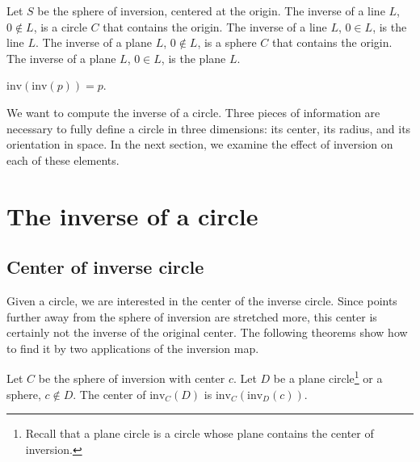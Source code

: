 \begin{corollary}
Let $S$ be the sphere of inversion, centered at the origin.
The inverse of a line $L$, $0 \not\in L$, is a circle $C$ that contains the 
origin.
The inverse of a line $L$, $0 \in L$, is the line $L$.
The inverse of a plane $L$, $0 \not\in L$, is a sphere $C$ that contains the
origin.
The inverse of a plane $L$, $0 \in L$, is the plane $L$.
\end{corollary}
$\mbox{inv}(\mbox{inv}(p)) = p$.
\QED

We want to compute the inverse of a circle.
Three pieces of information are necessary to fully define 
a circle in three dimensions: its center, its radius, and its
orientation in space.
In the next section, we examine the effect of inversion on each of these
elements.


\section{The inverse of a circle}
\label{sec-circleinverse}

\subsection{Center of inverse circle}

Given a circle, 
we are interested in the center of the inverse circle.
Since points further away from the sphere of inversion are
stretched more, this center is certainly not the inverse 
of the original center.
The following theorems show how to find it by two applications of the
inversion map.


\begin{theorem}
\label{thm-twoappl1}
\cite{Coo71,D49}
%
%
Let $C$ be the sphere of inversion with center $c$.
Let $D$ be a plane circle\footnote{Recall that a plane circle is a
	circle whose plane contains the center of inversion.}
or a sphere, $c \not \in D$.
The center of $\mbox{inv}_{C}(D)$ is $ \mbox{inv}_{C} ( \mbox{inv}_{D} (c))$.
\end{theorem}

